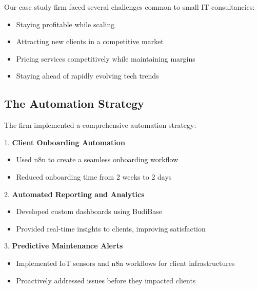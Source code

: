 Our case study firm faced several challenges common to small IT consultancies:
\begin{itemize}
    \item Staying profitable while scaling
    \item Attracting new clients in a competitive market
    \item Pricing services competitively while maintaining margins
    \item Staying ahead of rapidly evolving tech trends
\end{itemize}

\subsection{The Automation Strategy}

The firm implemented a comprehensive automation strategy:

1. \textbf{Client Onboarding Automation}
\begin{itemize}
    \item Used n8n to create a seamless onboarding workflow
    \item Reduced onboarding time from 2 weeks to 2 days
\end{itemize}

2. \textbf{Automated Reporting and Analytics}
\begin{itemize}
    \item Developed custom dashboards using BudiBase
    \item Provided real-time insights to clients, improving satisfaction
\end{itemize}

3. \textbf{Predictive Maintenance Alerts}
\begin{itemize}
    \item Implemented IoT sensors and n8n workflows for client infrastructures
    \item Proactively addressed issues before they impacted clients
\end{itemize}

